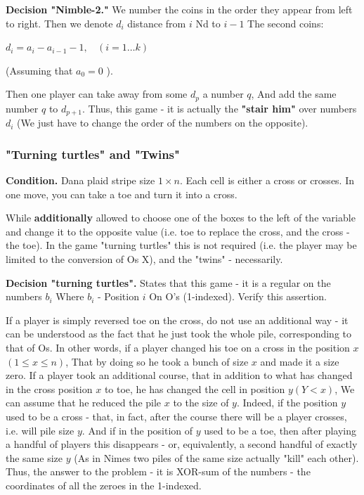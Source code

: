 \textbf{Decision "Nimble-2."} We number the coins in the order they appear from left to right. Then we denote $d_i$ distance from $i$ Nd to $i-1$ The second coins:

$d_i = a_i - a_ {i-1} - 1, ~ ~ ~ ~ (i = 1 \ldots k)$

(Assuming that $a_0 = 0$ ).

Then one player can take away from some $d_p$ a number $q$, And add the same number $q$ to $d_ {p +1}$. Thus, this game - it is actually the \textbf{"stair him"} over numbers $d_i$ (We just have to change the order of the numbers on the opposite).

\subsubsection{ "Turning turtles" and "Twins" }

\textbf{Condition.} Dana plaid stripe size $1 \times n$. Each cell is either a cross or crosses. In one move, you can take a toe and turn it into a cross.

While \textbf{additionally} allowed to choose one of the boxes to the left of the variable and change it to the opposite value (i.e. toe to replace the cross, and the cross - the toe). In the game "turning turtles" this is not required (i.e. the player may be limited to the conversion of Os X), and the "twins" - necessarily.

\textbf{Decision "turning turtles".} States that this game - it is a regular on the numbers $b_i$ Where $b_i$ - Position $i$ On O's (1-indexed). Verify this assertion.

If a player is simply reversed toe on the cross, do not use an additional way - it can be understood as the fact that he just took the whole pile, corresponding to that of Os. In other words, if a player changed his toe on a cross in the position $x$$(1 \le x \le n)$, That by doing so he took a bunch of size $x$ and made it a size zero.
If a player took an additional course, that in addition to what has changed in the cross position $x$ to toe, he has changed the cell in position $y$$(Y <x)$, We can assume that he reduced the pile $x$ to the size of $y$. Indeed, if the position $y$ used to be a cross - that, in fact, after the course there will be a player crosses, i.e. will pile size $y$. And if in the position of $y$ used to be a toe, then after playing a handful of players this disappears - or, equivalently, a second handful of exactly the same size $y$ (As in Nimes two piles of the same size actually "kill" each other).
Thus, the answer to the problem - it is XOR-sum of the numbers - the coordinates of all the zeroes in the 1-indexed.

